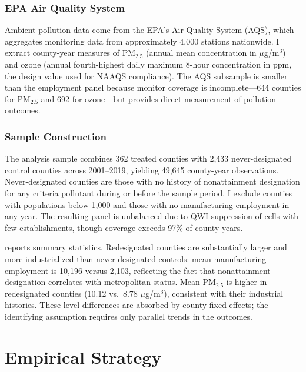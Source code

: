 \documentclass[12pt]{article}
\begin{document}
\subsubsection*{EPA Air Quality System} Ambient pollution data come from the EPA's Air Quality System (AQS), which aggregates monitoring data from approximately 4,000 stations nationwide. I extract county-year measures of PM$_{2.5}$ (annual mean concentration in $\mu$g/m$^3$) and ozone (annual fourth-highest daily maximum 8-hour concentration in ppm, the design value used for NAAQS compliance). The AQS subsample is smaller than the employment panel because monitor coverage is incomplete---644 counties for PM$_{2.5}$ and 692 for ozone---but provides direct measurement of pollution outcomes.

\subsubsection*{Sample Construction} The analysis sample combines 362 treated counties with 2,433 never-designated control counties across 2001--2019, yielding 49,645 county-year observations. Never-designated counties are those with no history of nonattainment designation for any criteria pollutant during or before the sample period. I exclude counties with populations below 1,000 and those with no manufacturing employment in any year. The resulting panel is unbalanced due to QWI suppression of cells with few establishments, though coverage exceeds 97\% of county-years.

 reports summary statistics. Redesignated counties are substantially larger and more industrialized than never-designated controls: mean manufacturing employment is 10,196 versus 2,103, reflecting the fact that nonattainment designation correlates with metropolitan status. Mean PM$_{2.5}$ is higher in redesignated counties (10.12 vs.\ 8.78 $\mu$g/m$^3$), consistent with their industrial histories. These level differences are absorbed by county fixed effects; the identifying assumption requires only parallel trends in the outcomes.




\section{Empirical Strategy}
\label{sec:strategy}
\end{document}
